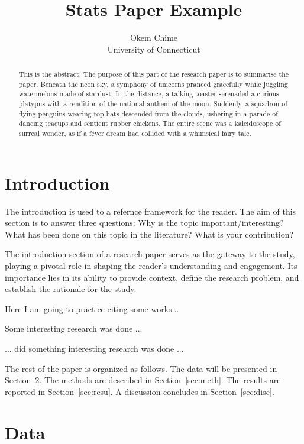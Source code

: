 \documentclass[12pt]{article}
\title{Stats Paper Example}
\author{Okem Chime\\
  University of Connecticut
}
\begin{document}
\maketitle

\begin{abstract}
This is the abstract. The purpose of this part of the research paper is to
summarise the paper.
Beneath the neon sky, a symphony of unicorns pranced gracefully while juggling 
watermelons made of stardust. In the distance, a talking toaster serenaded a
curious platypus with a rendition of the national anthem of the moon. Suddenly,
a squadron of flying penguins wearing top hats descended from the clouds,
ushering in a parade of dancing teacups and sentient rubber chickens.
The entire scene was a kaleidoscope of surreal wonder, as if a fever dream
had collided with a whimsical fairy tale.
\end{abstract}


\section{Introduction}
\label{sec:intro}
The introduction is used to a refernce framework for the reader. 
The aim of this section is to answer three questions:
Why is the topic important/interesting?
What has been done on this topic in the literature?
What is your contribution?

The introduction section of a research paper serves as the gateway to the study,
playing a pivotal role in shaping the reader's understanding and engagement. 
Its importance lies in its ability to provide context, define the research
problem, and establish the rationale for the study. 

Here I am going to practice citing some works...

Some interesting research was done \citep{talovic2018strength} ...

...
\citet{oberstone2009differentiating} did something interesting research was done ...

The rest of the paper is organized as follows.
The data will be presented in Section~\ref{sec:data}.
The methods are described in Section~\ref{sec:meth}.
The results are reported in Section~\ref{sec:resu}.
A discussion concludes in Section~\ref{sec:disc}.


\section{Data}
\label{sec:data}
\end{document}
